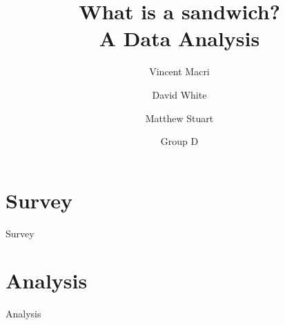 \documentclass[letterpaper,12pt]{report}
\title{\Huge What is a sandwich?\\\LARGE A Data Analysis}
\author{Vincent Macri \and David White \and Matthew Stuart \and Group D}
\begin{document}
	\maketitle
	
	\tableofcontents
	\clearpage
	\part{Survey}\label{part:survey}
		{Survey}
	\part{Analysis}\label{part:analysis}
		{Analysis}
	\nocite{*}
	\printbibliography
\end{document}
